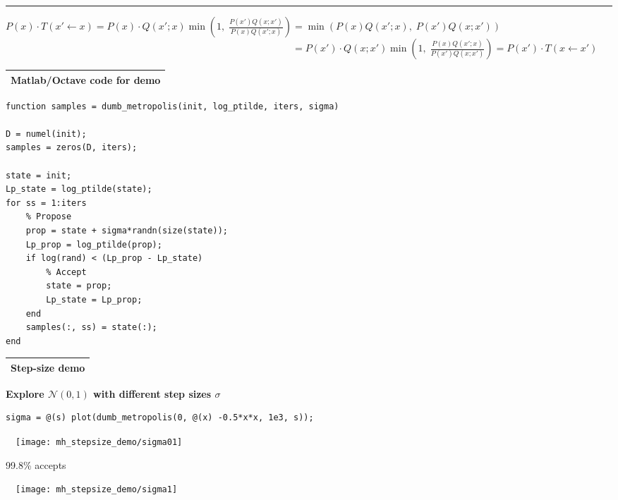 \documentclass[25pt,landscape]{foils}
\newcommand{\Gray}{\textcolor{mygray}}
\newcommand{\Green}{\textcolor{mypine}}
\newcommand{\myfoilhead}[1]{
\newpage
\vspace*{-1cm}
\Gray{
\begin{tabular*}{\textwidth}{l}
{\bf \Huge #1} \\
\bottomrule
\end{tabular*}}}
\newcommand{\N}{\mathcal{N}}
\newcommand{\la}{\!\leftarrow\!}
\begin{document}
\vfill

\hrule
\vspace*{0.2in}
{\tiny$\displaystyle%
P(x)\cdot T(x'\la x) = P(x)\cdot Q(x';x)\min\!\left(1,\; \frac{P(x')Q(x;x')}{P(x)Q(x';x)}\right)%
= \min\!\left(P(x)Q(x';x),\;P(x')Q(x;x')\right)$\\
$\displaystyle%
\phantom{P(x)\cdot T(x'\la x) = P(x)\cdot Q(x';x)\min\!\left(1,\; \frac{P(x')Q(x;x')}{P(x)Q(x';x)}\right)}%
= P(x')\cdot Q(x;x')\min\!\left(1,\; \frac{P(x)Q(x';x)}{P(x')Q(x;x')}\right)
= P(x')\cdot T(x\la x')$}

\vspace*{-0.5cm}


\myfoilhead{Matlab/Octave code for demo}

\vfill

{\small
\begin{verbatim}
function samples = dumb_metropolis(init, log_ptilde, iters, sigma)

D = numel(init);
samples = zeros(D, iters);

state = init;
Lp_state = log_ptilde(state);
for ss = 1:iters
    % Propose
    prop = state + sigma*randn(size(state));
    Lp_prop = log_ptilde(prop);
    if log(rand) < (Lp_prop - Lp_state)
        % Accept
        state = prop;
        Lp_state = Lp_prop;
    end
    samples(:, ss) = state(:);
end
\end{verbatim}}

\vfill

\myfoilhead{Step-size demo}

\vfill

\Green{\bf Explore $\N(0,1)$ with different step sizes $\sigma$}

\bigskip

{\small
\begin{verbatim}
sigma = @(s) plot(dumb_metropolis(0, @(x) -0.5*x*x, 1e3, s));
\end{verbatim}}

\vfill {}~~\texttt{[image: mh\_stepsize\_demo/sigma01]}

\vspace*{-2cm}
{\small 99.8\% accepts}
\vspace*{1cm}

\vfill {}~~\texttt{[image: mh\_stepsize\_demo/sigma1]}
\end{document}
